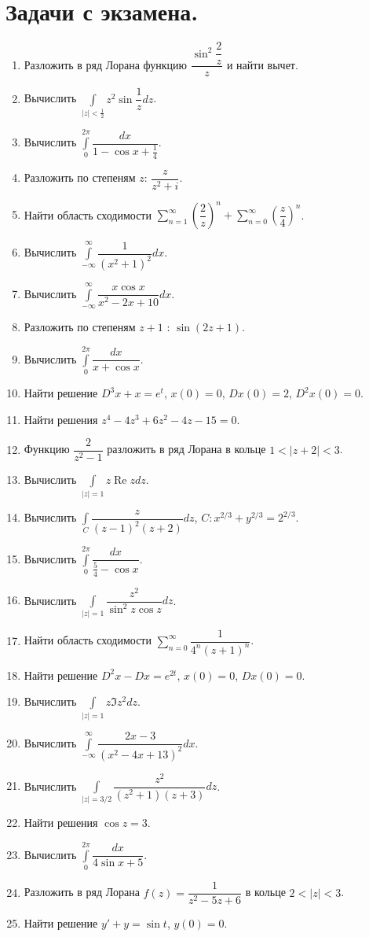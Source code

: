 \documentclass[a4paper, 12pt]{report}
\date{}
\numberwithin{equation}{section}
\renewcommand{\Re}{\operatorname{Re}}
\begin{document}
	\newpage
	\section*{Задачи с экзамена.}
	\begin{enumerate}
		\item Разложить в ряд Лорана функцию $\dfrac{\sin^2 \dfrac 2 z}z$ и найти вычет.
		\item Вычислить $\int\limits_{|z|<\frac12} z^2\sin\dfrac 1z dz$.
		\item Вычислить $\int\limits_0^{2\pi}\dfrac{dx}{1-\cos x + \frac 14}$.
		\item Разложить по степеням $z$: $\dfrac{z}{z^2+i}$.
		\item Найти область сходимости $\sum_{n=1}^{\infty}\left(\dfrac 2 z \right)^n + \sum_{n=0}^{\infty}\left(\dfrac z 4 \right)^n$.
		\item Вычислить $\int\limits_{-\infty}^\infty \dfrac{1}{(x^2+1)^2}dx$.
		\item Вычислить $\int\limits_{-\infty}^\infty \dfrac{x\cos x}{x^2 - 2x + 10}dx$.
		\item Разложить по степеням $z+1$ : $\sin(2z+1)$.
		\item Вычислить $\int\limits_0^{2\pi}\dfrac{dx}{x+\cos x}$.
		\item Найти решение $D^3x+x=e^t$, $x(0)=0$, $Dx(0)=2$, $D^2x(0)=0$.
		\item Найти решения $z^4 - 4z^3 + 6z^2 - 4z - 15 = 0$.
		\item Функцию $\dfrac{2}{z^2-1}$ разложить в ряд Лорана в кольце $1<|z+2|<3$.
		\item Вычислить $\int\limits_{|z|=1} z \Re z dz$.
		\item Вычислить $\int\limits_{C} \dfrac{z}{(z-1)^2(z+2)} dz$, $C:x^{2/3}+y^{2/3}=2^{2/3}$.
		\item Вычислить $\int\limits_0^{2\pi}\dfrac{dx}{\frac 54-\cos x}$.
		\item Вычислить $\int\limits_{|z|=1} \dfrac{z^2}{\sin^2 z \cos z} dz$.
		\item Найти область сходимости $\sum_{n=0}^\infty \dfrac{1}{4^n(z+1)^n}$.
		\item Найти решение $D^2x-Dx=e^{2t}$, $x(0)=0$, $Dx(0)=0$.
		\item Вычислить $\int\limits_{|z|=1} z \Im z^2 dz$.
		\item Вычислить $\int\limits_{-\infty}^\infty \dfrac{2x-3}{(x^2-4x+13)^2} dx$.
		\item Вычислить $\int\limits_{|z|=3/2} \dfrac{z^2}{(z^2+1)(z+3)} dz$.
		\item Найти решения $\cos z = 3$.
		\item Вычислить $\int\limits_0^{2\pi}\dfrac{dx}{4\sin x+5}$.
		\item Разложить в ряд Лорана $f(z)=\dfrac{1}{z^2-5z+6}$ в кольце $2<|z|<3$.
		\item Найти решение $y'+y=\sin t$, $y(0)=0$.
	\end{enumerate}
	
\end{document}
